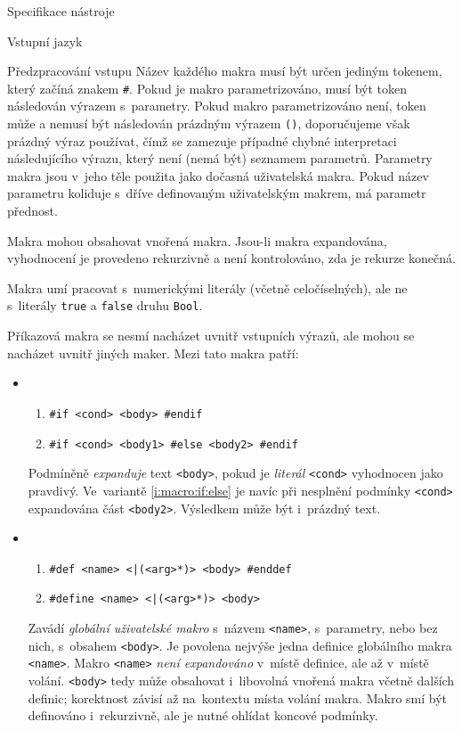 \documentclass[thesis=M,czech]{FITthesis}[2012/06/26]
\newcommand{\id}[1]{\texttt{#1}}
\newcommand{\hl}[1]{\textit{#1}}
\newcommand{\rf}[1]{\ref{#1}}
\begin{document}
\begin{section}{Specifikace nástroje}
\begin{subsection}{Vstupní jazyk}
\begin{subsubsection}{Předzpracování vstupu}
Název každého makra musí být určen jediným tokenem,
který začíná znakem \id{\#}.
Pokud je makro parametrizováno,
musí být token následován výrazem s~parametry.
Pokud makro parametrizováno není,
token může a nemusí být následován prázdným výrazem \id{()},
doporučujeme však prázdný výraz používat,
čímž se zamezuje případné chybné interpretaci následujícího výrazu,
který není (nemá být) seznamem parametrů.
Parametry makra jsou v~jeho těle použita
jako dočasná uživatelská makra. Pokud název parametru
koliduje s~dříve definovaným uživatelským makrem,
má parametr přednost.

Makra mohou obsahovat vnořená makra.
Jsou-li makra expandována, vyhodnocení je provedeno rekurzivně
a není kontrolováno, zda je rekurze konečná.

Makra umí pracovat s~numerickými literály (včetně celočíselných),
ale ne s~literály \id{true} a \id{false} druhu \id{Bool}.


\begin{paragraph}{Příkazová makra}
\label{p:design:spec:ilang:macros:cmd}
se nesmí nacházet uvnitř vstupních výrazů,
ale mohou se nacházet uvnitř jiných maker.
Mezi tato makra patří:
\begin{itemize}
\item
   \begin{enumerate}
   \item \label{i:macro:if:if}
      \id{\#if <cond> <body> \#endif}
   \item \label{i:macro:if:else}
      \id{\#if <cond> <body1> \#else <body2> \#endif}
   \end{enumerate}
   Podmíněně \hl{expanduje} text \id{<body>},
   pokud je \hl{literál} \id{<cond>} vyhodnocen jako pravdivý.
   Ve~variantě \rf{i:macro:if:else}
   je navíc při nesplnění podmínky \id{<cond>}
   expandována část \id{<body2>}.
   Výsledkem může být i~prázdný text.
\item
   \begin{enumerate}
   \item \label{i:macro:def:def}
      \id{\#def <name> <|(<arg>*)> <body> \#enddef}
   \item \label{i:macro:def:define}
      \id{\#define <name> <|(<arg>*)> <body>}
   \end{enumerate}
   Zavádí \hl{globální uživatelské makro} s~názvem \id{<name>},
   s~parametry, nebo bez nich,
   s~obsahem \id{<body>}.
   Je povolena nejvýše jedna definice globálního makra \id{<name>}.
   Makro \id{<name>} \hl{není expandováno} v~místě definice,
   ale až v~místě volání.
   \id{<body>} tedy může obsahovat i~libovolná vnořená makra
   včetně dalších definic; korektnost závisí až na~kontextu
   místa volání makra. Makro smí být definováno i~rekurzivně,
   ale je nutné ohlídat koncové podmínky.


\end{itemize}
\end{paragraph}
\end{subsubsection}
\end{subsection}
\end{section}
\end{document}
